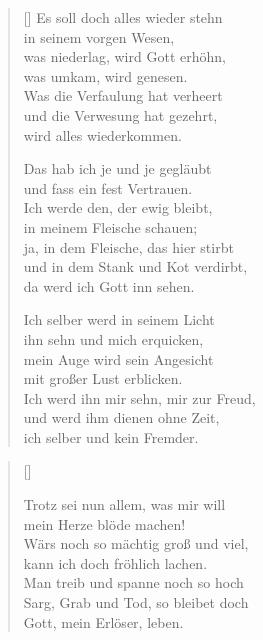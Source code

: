 \begin{multicols}{2}
\begin{verse}[\versewidth]
 Es soll doch alles wieder stehn\\
in seinem vorgen Wesen,\\
was niederlag, wird Gott erhöhn,\\
was umkam, wird genesen.\\
Was die Verfaulung hat verheert\\
und die Verwesung hat gezehrt,\\
wird alles wiederkommen.

 Das hab ich je und je gegläubt\\
und fass ein fest Vertrauen.\\
Ich werde den, der ewig bleibt,\\
in meinem Fleische schauen;\\
ja, in dem Fleische, das hier stirbt\\
und in dem Stank und Kot verdirbt,\\
da werd ich Gott inn sehen.

 Ich selber werd in seinem Licht\\
ihn sehn und mich erquicken,\\
mein Auge wird sein Angesicht\\
mit großer Lust erblicken.\\
Ich werd ihn mir sehn, mir zur Freud,\\
und werd ihm dienen ohne Zeit,\\
ich selber und kein Fremder.

\end{verse}
\end{multicols}

\begin{center}
\settowidth{\versewidth}{Der, vor dem die Welt erschrickt,}
\begin{verse}[\versewidth]


 Trotz sei nun allem, was mir will\\
mein Herze blöde machen!\\
Wärs noch so mächtig groß und viel,\\
kann ich doch fröhlich lachen.\\
Man treib und spanne noch so hoch\\
Sarg, Grab und Tod, so bleibet doch\\
Gott, mein Erlöser, leben.
  
\end{verse}
\end{center}
